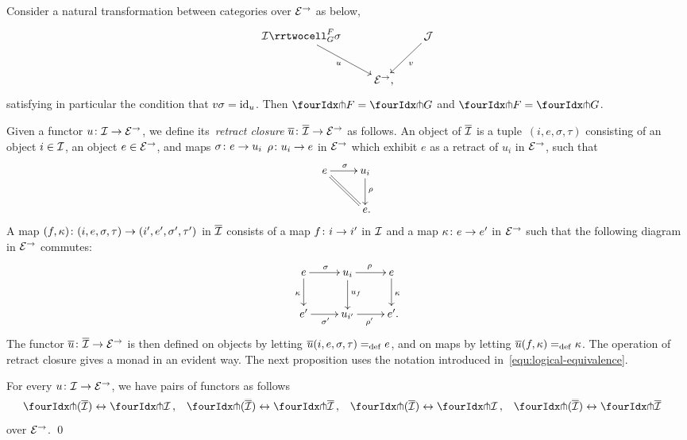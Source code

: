\documentclass[reqno,10pt,a4paper,oneside,draft]{amsart}
\begin{document}
{{\begin{proposition} \label{thm:orth-nat}
Consider a natural transformation between categories over $\catE^\to$ as below,
\[
\xymatrix{
  \cal{I}
  \rrtwocell_G^F{\sigma}
 \ar[dr]_{u}
&&
  \cal{J}
  \ar[dl]^{v}
\\&
  \catE^\to
\rlap{,}}
\]
satisfying in particular the condition that $v \sigma = \id_u$.
Then $\liftr{F} = \liftr{G}$ and $\liftl{F} = \liftl{G}$.
\end{proposition}


Given a functor $u \co \cal{I} \to \calE^\to$, we define its~\emph{retract closure} $\overline{u} \co \overline{\cal{I}} \to \catE^\to$ as follows.
An object of $\overline{\cal{I}}$ is a tuple~$(i, e, \sigma, \tau)$ consisting of an object $i \in \cal{I}$, an object $e \in \catE^\to$, and maps $\sigma \co e \rightarrow u_i$ $\rho \co u_i \rightarrow e$ in $\catE^\to$ which exhibit $e$ as a retract of $u_i$ in $\catE^\to$, \ie such that
\[
\xymatrix{
  e
  \ar[r]^{\sigma}
  \ar@{=}[dr]
&
  u_i
  \ar[d]^{\rho}
\\&
  e
\rlap{.}}
\]
A map $(f, \kappa) \co (i, e, \sigma, \tau) \to (i', e', \sigma', \tau')$ in $\overline{\cal{I}}$ consists of a map $f \co i \to i'$ in $\cal{I}$ and a map $\kappa \co e \rightarrow e'$ in $\catE^\to$ such that the following diagram in $\catE^\to$ commutes:
\[
\xymatrix{
  e
  \ar[r]^{\sigma}
  \ar[d]_{\kappa}
&
  u_i
  \ar[r]^{\rho}
  \ar[d]^{u_f}
&
  e
  \ar[d]^{\kappa}
\\
  e'
  \ar[r]_{\sigma'}
&
  u_{i'}
  \ar[r]_{\rho'}
&
  e'
\rlap{.}}
\]
The functor $\overline{u} \co \overline{\cal{I}} \to \catE^\to$ is then defined on objects by letting $\overline{u}(i, e, \sigma, \tau) \defeq e$, and on maps by letting $\overline{u}(f, \kappa) \defeq \kappa$.
The operation of retract closure gives a monad in an evident way. The next proposition uses the notation introduced in~\eqref{equ:logical-equivalence}.

\begin{proposition} \label{retract-closure}
For every $u \co \cal{I} \to \catE^\to$, we have pairs of  functors as follows
\[
\begin{aligned}
  \liftr{(\overline{\cal{I}})} &\leftrightarrow \liftr{\cal{I}}
\, ,&
  \liftr{(\overline{\overline{\cal{I}}})} &\leftrightarrow \liftr{\overline{\cal{I}}}
\, ,&
  \liftl{(\overline{\cal{I}})} &\leftrightarrow \liftl{\cal{I}}
\, ,&
 \liftl{(\overline{\overline{\cal{I}}})} &\leftrightarrow \liftl{\overline{\cal{I}}}
\end{aligned}
\]
over $\catE^\to$.
\qed
\end{proposition}



}}
\end{document}
